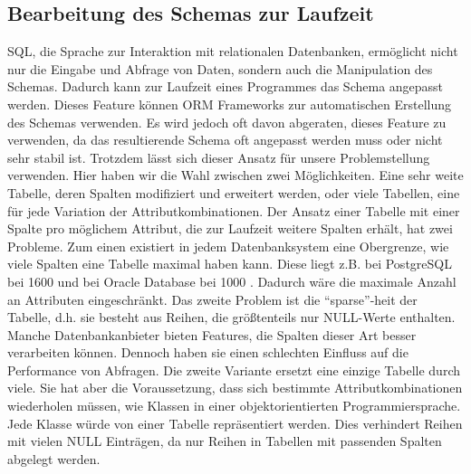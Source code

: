 
\subsection{Bearbeitung des Schemas zur Laufzeit}

SQL, die Sprache zur Interaktion mit relationalen Datenbanken, ermöglicht nicht nur die Eingabe und Abfrage von Daten, sondern auch die Manipulation des Schemas. Dadurch kann zur Laufzeit eines Programmes das Schema angepasst werden. Dieses Feature können \ac{ORM} Frameworks zur automatischen Erstellung des Schemas verwenden. Es wird jedoch oft davon abgeraten, dieses Feature zu verwenden, da das resultierende Schema oft angepasst werden muss oder nicht sehr stabil ist\cite{VladMihalcea.}. Trotzdem lässt sich dieser Ansatz für unsere Problemstellung verwenden. Hier haben wir die Wahl zwischen zwei Möglichkeiten. 
Eine sehr weite Tabelle, deren Spalten modifiziert und erweitert werden, oder viele Tabellen, eine für jede Variation der Attributkombinationen.
Der Ansatz einer Tabelle mit einer Spalte pro möglichem Attribut, die zur Laufzeit weitere Spalten erhält, hat zwei Probleme. Zum einen existiert in jedem Datenbanksystem eine Obergrenze, wie viele Spalten eine Tabelle maximal haben kann. Diese liegt z.B. bei PostgreSQL bei 1600 \cite{PostgreSQLDocumentation.2021b} und bei Oracle Database bei 1000 \cite{OracleHelpCenter.2021}. Dadurch wäre die maximale Anzahl an Attributen eingeschränkt. Das zweite Problem ist die ``sparse''-heit der Tabelle, d.h. sie besteht aus Reihen, die größtenteils nur NULL-Werte enthalten. Manche Datenbankanbieter bieten Features, die Spalten dieser Art besser verarbeiten können. Dennoch haben sie einen schlechten Einfluss auf die Performance von Abfragen. \cite{Chu.2007}
Die zweite Variante ersetzt eine einzige Tabelle durch viele. Sie hat aber die Voraussetzung, dass sich bestimmte Attributkombinationen wiederholen müssen, wie Klassen in einer objektorientierten Programmiersprache. Jede Klasse würde von einer Tabelle repräsentiert werden. Dies verhindert Reihen mit vielen NULL Einträgen, da nur Reihen in Tabellen mit passenden Spalten abgelegt werden.
